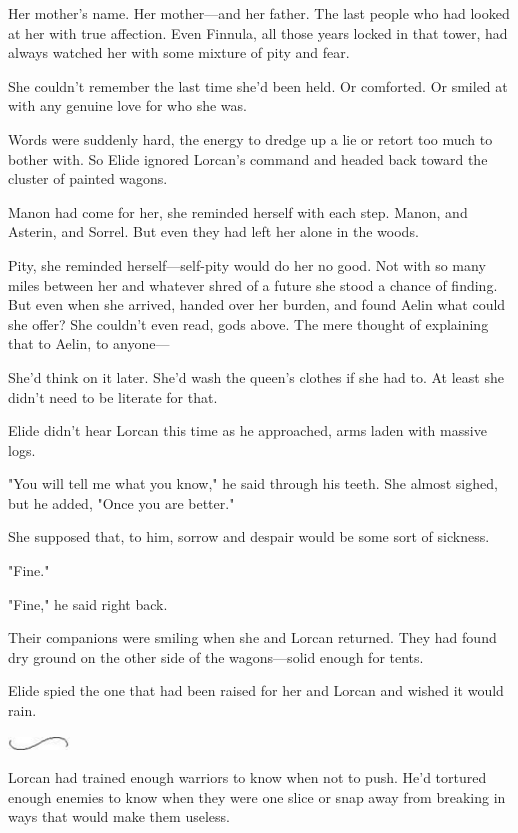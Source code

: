 Her mother's name. Her mother---and her father. The last people who had looked at her with true affection. Even Finnula, all those years locked in that tower, had always watched her with some mixture of pity and fear.

She couldn't remember the last time she'd been held. Or comforted. Or smiled at with any genuine love for who she was.

Words were suddenly hard, the energy to dredge up a lie or retort too much to bother with. So Elide ignored Lorcan's command and headed back toward the cluster of painted wagons.

Manon had come for her, she reminded herself with each step. Manon, and Asterin, and Sorrel. But even they had left her alone in the woods.

Pity, she reminded herself---self-pity would do her no good. Not with so many miles between her and whatever shred of a future she stood a chance of finding. But even when she arrived, handed over her burden, and found Aelin  what could she offer? She couldn't even read, gods above. The mere thought of explaining that to Aelin, to anyone---

She'd think on it later. She'd wash the queen's clothes if she had to. At least she didn't need to be literate for that.

Elide didn't hear Lorcan this time as he approached, arms laden with massive logs.

"You will tell me what you know," he said through his teeth. She almost sighed, but he added, "Once you are  better."

She supposed that, to him, sorrow and despair would be some sort of sickness.

"Fine."

"Fine," he said right back.

Their companions were smiling when she and Lorcan returned. They had found dry ground on the other side of the wagons---solid enough for tents.

Elide spied the one that had been raised for her and Lorcan and wished it would rain.

\includegraphics[width=0.65in,height=0.13in]{images/seperator}

Lorcan had trained enough warriors to know when not to push. He'd tortured enough enemies to know when they were one slice or snap away from breaking in ways that would make them useless.

